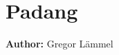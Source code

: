 \section{Padang}
\label{sec:padang}
\hfill \textbf{Author:} Gregor Lämmel

\citep[][]{Laemmel_PhDThesis_2011}


